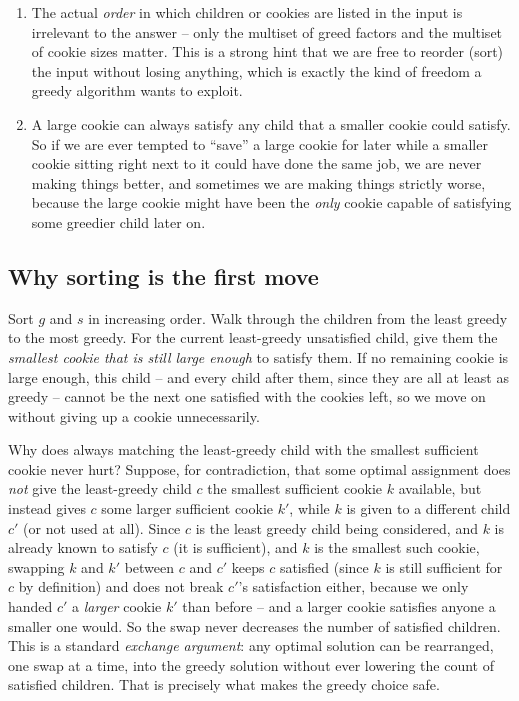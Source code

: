 \begin{enumerate}
  \item The actual \emph{order} in which children or cookies are listed in
        the input is irrelevant to the answer -- only the multiset of greed
        factors and the multiset of cookie sizes matter. This is a strong hint
        that we are free to reorder (sort) the input without losing anything,
        which is exactly the kind of freedom a greedy algorithm wants to
        exploit.
  \item A large cookie can always satisfy any child that a smaller cookie
        could satisfy. So if we are ever tempted to ``save'' a large cookie
        for later while a smaller cookie sitting right next to it could have
        done the same job, we are never making things better, and sometimes
        we are making things strictly worse, because the large cookie might
        have been the \emph{only} cookie capable of satisfying some greedier
        child later on.
\end{enumerate}

\subsection*{Why sorting is the first move}

\begin{ideabox}
Sort $g$ and $s$ in increasing order. Walk through the children from the
least greedy to the most greedy. For the current least-greedy unsatisfied
child, give them the \emph{smallest cookie that is still large enough} to
satisfy them. If no remaining cookie is large enough, this child -- and every
child after them, since they are all at least as greedy -- cannot be the next
one satisfied with the cookies left, so we move on without giving up a
cookie unnecessarily.
\end{ideabox}

Why does always matching the least-greedy child with the smallest sufficient
cookie never hurt? Suppose, for contradiction, that some optimal assignment
does \emph{not} give the least-greedy child $c$ the smallest sufficient
cookie $k$ available, but instead gives $c$ some larger sufficient cookie
$k'$, while $k$ is given to a different child $c'$ (or not used at all). Since
$c$ is the least greedy child being considered, and $k$ is already known to
satisfy $c$ (it is sufficient), and $k$ is the smallest such cookie, swapping
$k$ and $k'$ between $c$ and $c'$ keeps $c$ satisfied (since $k$ is still
sufficient for $c$ by definition) and does not break $c'$'s satisfaction
either, because we only handed $c'$ a \emph{larger} cookie $k'$ than before --
and a larger cookie satisfies anyone a smaller one would. So the swap never
decreases the number of satisfied children. This is a standard
\emph{exchange argument}: any optimal solution can be rearranged, one swap at
a time, into the greedy solution without ever lowering the count of satisfied
children. That is precisely what makes the greedy choice safe.

